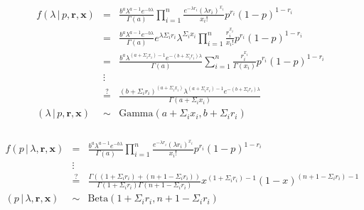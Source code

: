 \documentclass[11pt]{article}
\begin{document}
\begin{eqnarray*}
  f\left(\lambda\,|\,p,\mathbf{r},\mathbf{x}\right)&=&\frac{b^a\lambda^{a-1}e^{-b\lambda}}{\Gamma\left(a\right)}\prod_{i=1}^n\frac{e^{-\lambda r_i}\left(\lambda r_i\right)^{x_i}}{x_i!}p^{r_i}\left(1-p\right)^{1-r_i}\\
                                                   &=&\frac{b^a\lambda^{a-1}e^{-b\lambda}}{\Gamma\left(a\right)}e^{\lambda\Sigma_i r_i}\lambda^{\Sigma_i x_i}\prod_{i=1}^n\frac{r_i^{x_i}}{x_i!}p^{r_i}(1-p)^{1-r_i}\\
                                                   &=&\frac{b^a\lambda^{\left(a+\Sigma_i x_i\right)-1}e^{-\left(b+\Sigma_i r_i\right)\lambda}}{\Gamma\left(a\right)}\sum_{i=1}^n\frac{r_i^{x_i}}{\Gamma\left(x_i\right)}p^{r_i}\left(1-p\right)^{1-r_i}\\
                                                   &\vdots&\\
                                                   &\stackrel{?}{=}&\frac{\left(b+\Sigma_i r_i\right)^{\left(a+\Sigma_i x_i\right)}\lambda^{\left(a+\Sigma_i x_i\right)-1}e^{-\left(b+\Sigma_i r_i\right)\lambda}}{\Gamma\left(a+\Sigma_i x_i\right)}\\
  \left(\lambda\,|\,p,\mathbf{r},\mathbf{x}\right)&\sim&\textrm{Gamma}\left(a+\Sigma_i x_i,b+\Sigma_i r_i\right)
\end{eqnarray*}

\subsubsection{}

\begin{eqnarray*}
  f\left(p\,|\,\lambda,\mathbf{r},\mathbf{x}\right)&=&\frac{b^a\lambda^{a-1}e^{-b\lambda}}{\Gamma\left(a\right)}\prod_{i=1}^n\frac{e^{-\lambda r_i}\left(\lambda r_i\right)^{x_i}}{x_i!}p^{r_i}\left(1-p\right)^{1-r_i}\\
                                                   &\vdots&\\
                                                   &\stackrel{?}{=}&\frac{\Gamma\left(\left(1+\Sigma_i r_i\right)+\left(n+1-\Sigma_i r_i\right)\right)}{\Gamma\left(1+\Sigma_i r_i\right)\Gamma\left(n+1-\Sigma_i r_i\right)}x^{\left(1+\Sigma_i r_i\right)-1}\left(1-x\right)^{\left(n+1-\Sigma_i r_i\right)-1}\\
  \left(p\,|\,\lambda,\mathbf{r},\mathbf{x}\right)&\sim&\textrm{Beta}\left(1+\Sigma_i r_i,n+1-\Sigma_i r_i\right)
\end{eqnarray*}
\end{document}
